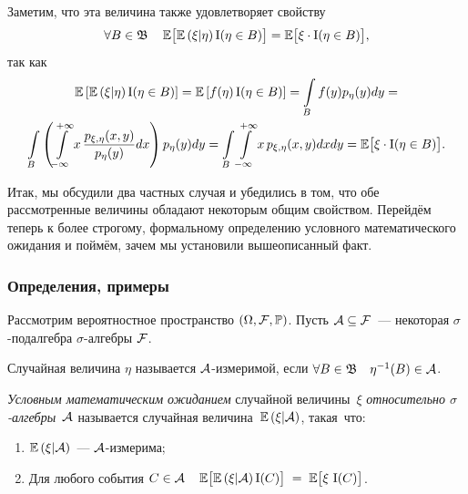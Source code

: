     \vspace{5mm}
    Заметим, что эта величина также удовлетворяет свойству
    \begin{equation*}
        \forall B \in \mathfrak{B} \quad \operatorname{\mathbb{E}} \bigl[ \operatorname{\mathbb{E}} \left( \xi | \eta\right) \operatorname{\mathrm{I}}(\eta \in B)\bigr] = 
        \operatorname{\mathbb{E}} \bigl[ \xi \cdot \operatorname{\mathrm{I}}(\eta \in B) \bigr],
    \end{equation*}
    так как
    \begin{gather*}
        \operatorname{\mathbb{E}} \left[ \operatorname{\mathbb{E}} \left(\xi | \eta\right) \operatorname{\mathrm{I}}(\eta \in B) \right] = 
        \operatorname{\mathbb{E}} \left[ f(\eta) \operatorname{\mathrm{I}}(\eta \in B) \right] = 
        \int\limits_{B} f(y) p_{\eta}(y)dy = \\
        \int\limits_{B} \left( \int\limits_{-\infty}^{+\infty} x \, \frac{p_{\xi, \eta}(x, y)}{p_{\eta}(y)} dx \right) p_{\eta}(y) dy = 
        \int\limits_{B} \int\limits_{-\infty}^{+\infty} x \, p_{\xi, \eta}(x, y) dxdy = 
        \operatorname{\mathbb{E}} \bigl[ \xi \cdot \operatorname{\mathrm{I}}(\eta \in B)\bigr].
    \end{gather*}

    Итак, мы обсудили два частных случая и убедились в том, что обе рассмотренные величины обладают некоторым общим свойством.
    Перейдём теперь к более строгому, формальному определению условного математического ожидания и поймём, зачем мы установили вышеописанный факт.

\subsubsection{Определения, примеры}
    Рассмотрим вероятностное пространство $(\Omega, \mathcal{F}, \operatorname{\mathbb{P}})$.
    Пусть $\mathcal{A} \subseteq \mathcal{F}$~--- некоторая $\sigma$-подалгебра $\sigma$-алгебры $\mathcal{F}$.
    \begin{defn}
        Случайная величина $\eta$ называется $\mathcal{A}$-измеримой, если $\forall B \in \mathfrak{B} \quad \eta^{-1}(B) \in \mathcal{A}$.
    \end{defn}
    
    \begin{defn}
        \textit{Условным математическим ожиданием} случайной величины~$\xi$ \textit{относительно $\sigma$-алгебры}~$\mathcal{A}$ 
        называется случайная величина~$\operatorname{\mathbb{E}} \left( \xi | \mathcal{A}\right)$, такая~что:
        \begin{enumerate}
            \item $\operatorname{\mathbb{E}} \left(\xi | \mathcal{A} \right)$~--- $\mathcal{A}$-измерима;
            \item Для любого события $C \in \mathcal{A} \quad \operatorname{\mathbb{E}} \bigl[ \operatorname{\mathbb{E}} \left( \xi | \mathcal{A} \right) \operatorname{\mathrm{I}}(C) \bigr] \; = \; \operatorname{\mathbb{E}} \bigl[ \xi \, \operatorname{\mathrm{I}}(C) \bigr]$.
        \end{enumerate}
    \end{defn}

